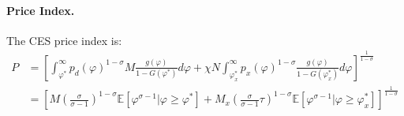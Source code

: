 \begin{solution}
	\paragraph{Price Index.} The CES price index is:
	\begin{align*}
		P &= \left[ \int_{\varphi^*}^{\infty} p_d(\varphi)^{1 - \sigma} M\frac{g(\varphi)}{1 - G(\varphi^*)} d\varphi + \chi N \int_{\varphi_x^*}^{\infty} p_x(\varphi)^{1 - \sigma} \frac{g(\varphi)}{1 - G(\varphi_x^*)} d\varphi \right]^{\frac{1}{1-\sigma}} \\
		&= \left[ M \left( \frac{\sigma}{\sigma - 1} \right)^{1 - \sigma} \mathbb{E}[\varphi^{\sigma - 1} | \varphi \geq \varphi^*] + M_x \left( \frac{\sigma}{\sigma - 1} \tau \right)^{1 - \sigma} \mathbb{E}[\varphi^{\sigma - 1} | \varphi \geq \varphi_x^*] \right]^{\frac{1}{1-\sigma}} \\
		\end{align*}
	\end{solution}